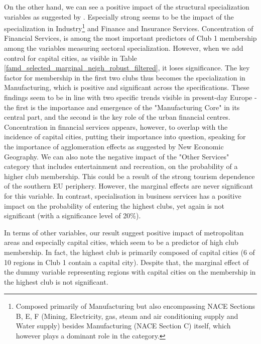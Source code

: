 \documentclass[11pt]{article}
\begin{document}
On the other hand, we can see a positive impact of the structural specialization variables as suggested by \citet{cutrini2019economic}. Especially strong seems to be the impact of the specialization in Industry\footnote{Composed primarily of Manufacturing but also encompassing NACE Sections B, E, F (Mining, Electricity, gas, steam and air conditioning supply and Water supply) besides Manufacturing (NACE Section C) itself, which however plays a dominant role in the category.} and Finance and Insurance Services. Concentration of Financial Services, is among the most important predictors of Club 1 membership among the variables measuring sectoral specialization. However, when we add control for capital cities, as visible in Table \ref{famd_selected_marginal_neigh_robust_filtered}, it loses significance. The key factor for membership in the first two clubs thus becomes the specialization in Manufacturing, which is positive and significant across the specifications. These findings seem to be in line with two specific trends visible in present-day Europe - the first is the importance and emergence of the "Manufacturing Core" in its central part, and the second is the key role of the urban financial centres. Concentration in financial services appears, however, to overlap with the incidence of capital cities, putting their importance into question, speaking for the importance of agglomeration effects as suggested by New Economic Geography.
We can also note the negative impact of the "Other Services" category that includes entertainment and recreation, on the probability of a higher club membership. This could be a result of the strong tourism dependence of the southern EU periphery. However, the marginal effects are never significant for this variable. In contrast, specialisation in business services has a positive impact on the probability of entering the highest clubs, yet again is not significant (with a significance level of 20\%).

In terms of other variables, our result suggest positive impact of metropolitan areas and especially capital cities, which seem to be a predictor of high club membership. In fact, the highest club is primarily composed of capital cities (6 of 10 regions in Club 1 contain a capital city). Despite that, the marginal effect of the dummy variable representing regions with capital cities on the membership in the highest club is not significant.
\end{document}
